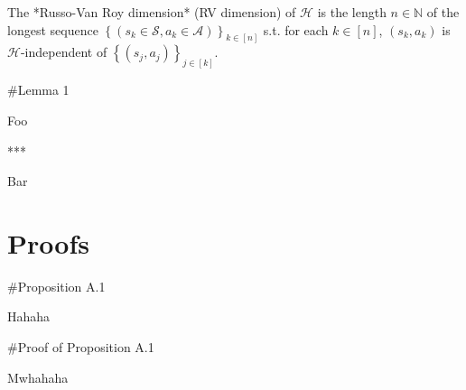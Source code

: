\documentclass[a4paper]{article}
\newcommand{\AP}[1]{\left(#1\right)}
\newcommand{\AC}[1]{\left\{#1\right\}}
\newcommand{\Nats}{\mathbb{N}}
\newcommand{\A}{\mathcal{A}}
\newcommand{\St}{\mathcal{S}}
\newcommand{\Hy}{\mathcal{H}}
\begin{document}
The *Russo-Van Roy dimension* (RV dimension) of $\Hy$ is the length $n\in\Nats$ of the longest sequence $\AC{\AP{s_k\in\St,a_k\in\A}}_{k\in[n]}$ s.t. for each $k\in[n]$, $\AP{s_k,a_k}$ is $\Hy$-independent of $\AC{\AP{s_j,a_j}}_{j\in[k]}$.

\#Lemma 1

Foo

***

Bar

\section{Proofs}

\#Proposition A.1

Hahaha

\#Proof of Proposition A.1

Mwhahaha
\end{document}
